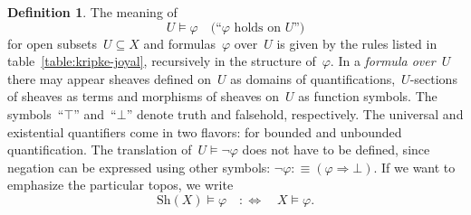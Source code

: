 \documentclass[10pt]{amsart}
\theoremstyle{definition}
\newtheorem{defn}{Definition}[section]
\theoremstyle{plain}
\theoremstyle{remark}
\newcommand{\Sh}{\mathrm{Sh}}
\newcommand{\?}{\,{:}\,}
\renewcommand{\_}{\mathpunct{.}\,}
\newcommand{\Ll}{:\Longleftrightarrow}
\begin{document}
\begin{defn}The meaning of 
\[ U \models \varphi \quad\text{(``$\varphi$ holds on $U$'')} \]
for open subsets~$U \subseteq X$ and formulas~$\varphi$ over~$U$ is given by
the rules listed in table~\ref{table:kripke-joyal}, recursively in the structure of~$\varphi$.
In a \emph{formula over~$U$} there may appear sheaves defined on~$U$ as domains
of quantifications,~$U$-sections of sheaves as terms and morphisms of sheaves
on~$U$ as function symbols. The symbols~``$\top$'' and~``$\bot$'' denote truth
and falsehold, respectively. The universal and existential quantifiers come in
two flavors: for bounded and unbounded quantification.
The translation of~$U \models \neg\varphi$ does not have to be defined, since
negation can be expressed using other symbols: $\neg\varphi :\equiv (\varphi
\Rightarrow \bot)$. If we want to emphasize the particular topos, we write
\[ \Sh(X) \models \varphi \quad\Ll\quad X \models \varphi. \]
\end{defn}
\end{document}
